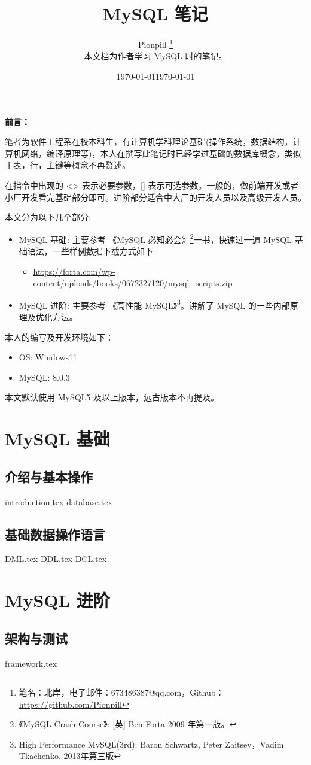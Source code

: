 \documentclass{PionpillNote-book}
\title{MySQL 笔记}
\author{
    Pionpill \footnote{笔名：北岸，电子邮件：673486387@qq.com，Github：\url{https://github.com/Pionpill}} \\
    本文档为作者学习 MySQL 时的笔记。\\
}
\date{\today}
\begin{document}
\pagestyle{plain}
\maketitle

\noindent\textbf{前言：}

笔者为软件工程系在校本科生，有计算机学科理论基础(操作系统，数据结构，计算机网络，编译原理等)，本人在撰写此笔记时已经学过基础的数据库概念，类似于表，行，主键等概念不再赘述。

在指令中出现的 <> 表示必要参数，[] 表示可选参数。一般的，做前端开发或者小厂开发看完基础部分即可。进阶部分适合中大厂的开发人员以及高级开发人员。

本文分为以下几个部分:
\begin{itemize}
    \item MySQL 基础: 主要参考 《MySQL 必知必会》\footnote{《MySQL Crash Course》: [英] Ben Forta 2009 年第一版。}一书，快速过一遍 MySQL 基础语法，一些样例数据下载方式如下:
    \begin{itemize}
        \item \url{https://forta.com/wp-content/uploads/books/0672327120/mysql_scripts.zip}
    \end{itemize}
    \item MySQL 进阶: 主要参考 《高性能 MySQL》\footnote{High Performance MySQL(3rd): Baron Schwartz, Peter Zaitsev，Vadim Tkachenko. 2013年第三版}。讲解了 MySQL 的一些内部原理及优化方法。
\end{itemize}

本人的编写及开发环境如下：
\begin{itemize}
    \item OS: Windows11 
    \item MySQL: 8.0.3
\end{itemize}

本文默认使用 MySQL5 及以上版本，远古版本不再提及。

\date{\today}
\newpage

\tableofcontents

\newpage

\setcounter{page}{1} 
\pagestyle{fancy}

\part{MySQL 基础}
\chapter{介绍与基本操作}
{introduction.tex}
{database.tex}
\chapter{基础数据操作语言}
{DML.tex}
{DDL.tex}
{DCL.tex}

\part{MySQL 进阶}
\chapter{架构与测试}
{framework.tex}
\end{document}
